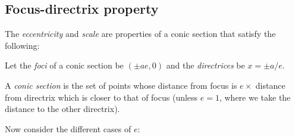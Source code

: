 \documentclass[a4paper]{article}
\begin{document}
\subsection{Focus-directrix property}
\begin{defi}
  The \emph{eccentricity} and \emph{scale} are properties of a conic section that satisfy the following:

  Let the \emph{foci} of a conic section be $(\pm ae, 0)$ and the \emph{directrices} be $x = \pm a/e$.

  A \emph{conic section} is the set of points whose distance from focus is $e \times$ distance from directrix which is closer to that of focus (unless $e = 1$, where we take the distance to the other directrix).
\end{defi}

Now consider the different cases of $e$:
\end{document}
